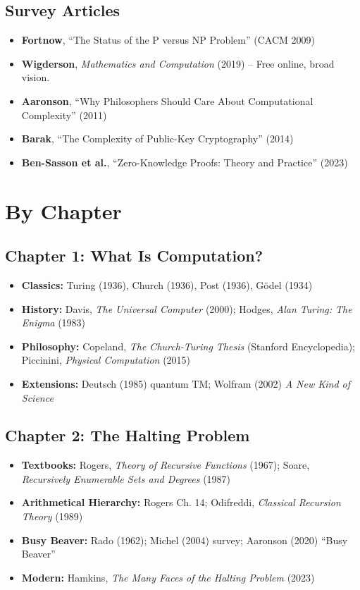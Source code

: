 \subsection{Survey Articles}
\begin{itemize}
\item \textbf{Fortnow}, ``The Status of the P versus NP Problem'' (CACM 2009)
\item \textbf{Wigderson}, \emph{Mathematics and Computation} (2019) -- Free online, broad vision.
\item \textbf{Aaronson}, ``Why Philosophers Should Care About Computational Complexity'' (2011)
\item \textbf{Barak}, ``The Complexity of Public-Key Cryptography'' (2014)
\item \textbf{Ben-Sasson et al.}, ``Zero-Knowledge Proofs: Theory and Practice'' (2023)
\end{itemize}

\section{By Chapter}

\subsection{Chapter 1: What Is Computation?}
\begin{itemize}
\item \textbf{Classics:} Turing (1936), Church (1936), Post (1936), G\"odel (1934)
\item \textbf{History:} Davis, \emph{The Universal Computer} (2000); Hodges, \emph{Alan Turing: The Enigma} (1983)
\item \textbf{Philosophy:} Copeland, \emph{The Church-Turing Thesis} (Stanford Encyclopedia); Piccinini, \emph{Physical Computation} (2015)
\item \textbf{Extensions:} Deutsch (1985) quantum TM; Wolfram (2002) \emph{A New Kind of Science}
\end{itemize}

\subsection{Chapter 2: The Halting Problem}
\begin{itemize}
\item \textbf{Textbooks:} Rogers, \emph{Theory of Recursive Functions} (1967); Soare, \emph{Recursively Enumerable Sets and Degrees} (1987)
\item \textbf{Arithmetical Hierarchy:} Rogers Ch. 14; Odifreddi, \emph{Classical Recursion Theory} (1989)
\item \textbf{Busy Beaver:} Rado (1962); Michel (2004) survey; Aaronson (2020) ``Busy Beaver''
\item \textbf{Modern:} Hamkins, \emph{The Many Faces of the Halting Problem} (2023)
\end{itemize}

